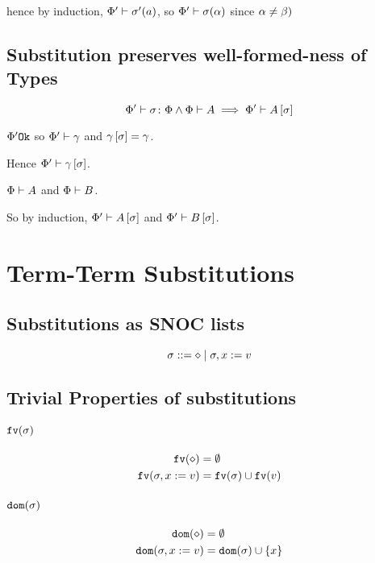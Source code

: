 \documentclass{report}
\begin{document}
hence by induction, $\Phi'\vdash \sigma'(a)$, so $\Phi'\vdash \sigma(\alpha)$ since $\alpha\neq\beta)$

\subsection{Substitution preserves well-formed-ness of Types}
\begin{equation}
    \Phi' \vdash \sigma \colon \Phi \wedge \Phi\vdash A \implies \Phi'\vdash A\left[\sigma\right]
\end{equation}
\proof
{}

$\Phi' \texttt{Ok}$ so $\Phi'\vdash \gamma$ and $\gamma\left[\sigma\right]=\gamma$.

Hence $\Phi'\vdash \gamma\left[\sigma\right]$.


\bi $\Phi\vdash A$ and $\Phi\vdash B$.

So by induction, $\Phi'\vdash A\left[\sigma\right]$ and $\Phi'\vdash B\left[\sigma\right]$.





\section{Term-Term Substitutions}
\subsection{Substitutions as SNOC lists}

\begin{equation}
   \sigma ::= \diamond \mid \sigma, x := v
\end{equation}

\subsection{Trivial Properties of substitutions}
\paragraph{$\texttt{fv}(\sigma)$}
\begin{align}
    \texttt{fv}(\diamond) &= \emptyset\\
    \texttt{fv}(\sigma, x:= v) &= \texttt{fv}(\sigma)\cup\texttt{fv}(v)
\end{align}
\paragraph{$\texttt{dom}(\sigma)$}
\begin{align}
    \texttt{dom}(\diamond) & = \emptyset\\
    \texttt{dom}(\sigma, x:= v) & = \texttt{dom}(\sigma)\cup\left\{x\right\}
\end{align}
\end{document}
